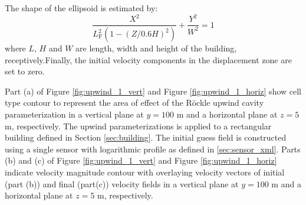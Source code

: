 The shape of the ellipsoid is estimated by:
\begin{equation}
\frac{X^{2}}{L_{\mathrm{F}}^{2}\left(1-(Z / 0.6 H)^{2}\right)}+\frac{Y^{2}}{W^{2}}=1
\label{eq:upwind}
\end{equation}
where $L$, $H$ and $W$ are length, width and height of the building, receptively.Finally, the initial velocity components in the displacement zone are set to zero.


Part (a) of Figure \ref{fig:upwind_1_vert} and Figure \ref{fig:upwind_1_horiz} show cell type contour to represent the area of effect of the R\"{o}ckle upwind cavity parameterization in a vertical plane at $y=100$ m and a horizontal plane at $z=5$ m, respectively. The upwind parameterizations is applied to a rectangular building defined in Section \ref{sec:building}. The initial guess field is constructed using a single sensor with logarithmic profile as defined in \ref{sec:sensor_xml}. Parts (b) and (c) of Figure \ref{fig:upwind_1_vert} and Figure \ref{fig:upwind_1_horiz} indicate velocity magnitude contour with overlaying velocity vectors of initial (part (b)) and final (part(c)) velocity fields in a vertical plane at $y=100$ m and a horizontal plane at $z=5$ m, respectively.

